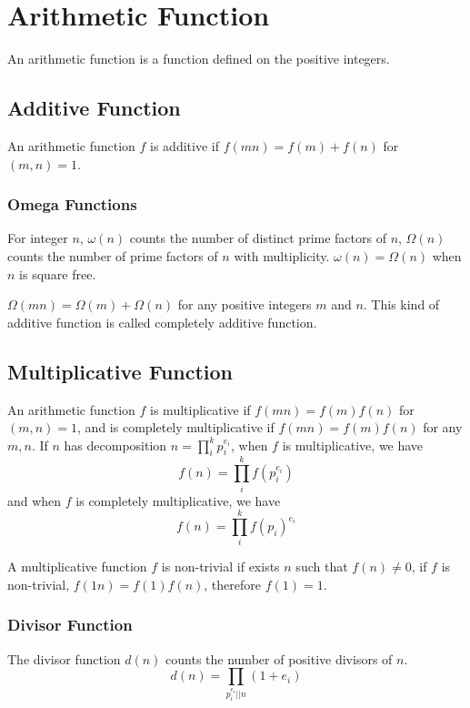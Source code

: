 \section{Arithmetic Function}
An arithmetic function is a function defined on the positive integers.

\subsection{Additive Function}
An arithmetic function $f$ is additive if $f(mn) = f(m) + f(n)$ for $(m, n) = 1$.

\subsubsection*{Omega Functions}
For integer $n$, $\omega(n)$ counts the number of distinct prime factors of $n$,
$\Omega(n)$ counts the number of prime factors of $n$ with multiplicity.
$\omega(n) = \Omega(n)$ when $n$ is square free.

$\Omega(mn) = \Omega(m) + \Omega(n)$ for any positive integers $m$ and $n$.
This kind of additive function is called completely additive function.

\subsection{Multiplicative Function}
An arithmetic function $f$ is multiplicative if $f(mn) = f(m)f(n)$ for $(m, n) = 1$,
and is completely multiplicative if $f(mn) = f(m)f(n)$ for any $m, n$.
If $n$ has decomposition $n = \prod_i^k p_i^{e_i}$, when $f$ is multiplicative, we have
$$f(n) = \prod_i^k f(p_i^{e_i})$$
and when $f$ is completely multiplicative, we have
$$f(n) = \prod_i^k f(p_i)^{e_i}$$

A multiplicative function $f$ is non-trivial if exists $n$ such that $f(n) \neq 0$,
if $f$ is non-trivial, $f(1 n) = f(1)f(n)$, therefore $f(1) = 1$.

\subsubsection*{Divisor Function}
The divisor function $d(n)$ counts the number of positive divisors of $n$.
$$d(n) = \prod_{p_i^{e_i} \vert\vert n} (1 + e_i)$$

